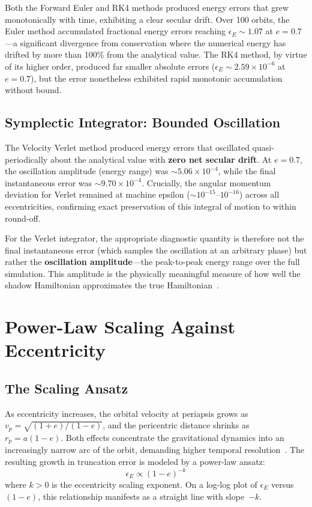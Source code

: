 \documentclass[twocolumn, 10pt]{article}
\begin{document}
Both the Forward Euler and RK4 methods produced energy errors that grew monotonically with time, exhibiting a clear secular drift. Over 100 orbits, the Euler method accumulated fractional energy errors reaching $\epsilon_E \sim 1.07$ at $e = 0.7$---a significant divergence from conservation where the numerical energy has drifted by more than 100\% from the analytical value. The RK4 method, by virtue of its higher order, produced far smaller absolute errors ($\epsilon_E \sim 2.59 \times 10^{-6}$ at $e = 0.7$), but the error nonetheless exhibited rapid monotonic accumulation without bound.

\subsection{Symplectic Integrator: Bounded Oscillation}

The Velocity Verlet method produced energy errors that oscillated quasi-periodically about the analytical value with \textbf{zero net secular drift}. At $e = 0.7$, the oscillation amplitude (energy range) was $\sim 5.06 \times 10^{-4}$, while the final instantaneous error was $\sim 9.70 \times 10^{-4}$. Crucially, the angular momentum deviation for Verlet remained at machine epsilon ($\sim 10^{-15}$--$10^{-16}$) across all eccentricities, confirming exact preservation of this integral of motion to within round-off.

For the Verlet integrator, the appropriate diagnostic quantity is therefore not the final instantaneous error (which samples the oscillation at an arbitrary phase) but rather the \textbf{oscillation amplitude}---the peak-to-peak energy range over the full simulation. This amplitude is the physically meaningful measure of how well the shadow Hamiltonian approximates the true Hamiltonian~\cite{rein2019}.

\section{Power-Law Scaling Against Eccentricity}

\subsection{The Scaling Ansatz}

As eccentricity increases, the orbital velocity at periapsis grows as $v_p = \sqrt{(1+e)/(1-e)}$, and the pericentric distance shrinks as $r_p = a(1-e)$. Both effects concentrate the gravitational dynamics into an increasingly narrow arc of the orbit, demanding higher temporal resolution~\cite{wang2020}. The resulting growth in truncation error is modeled by a power-law ansatz:
\begin{equation}
\epsilon_E \propto (1 - e)^{-k}
\label{eq:scaling}
\end{equation}
where $k > 0$ is the eccentricity scaling exponent. On a log-log plot of $\epsilon_E$ versus $(1 - e)$, this relationship manifests as a straight line with slope~$-k$.
\end{document}
